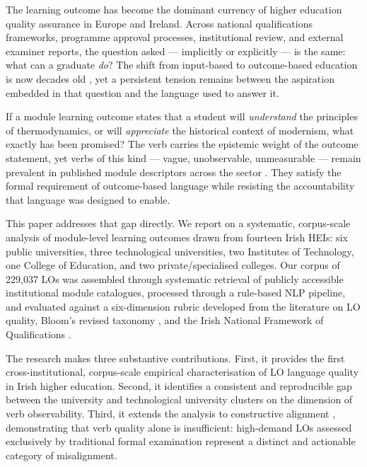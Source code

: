 \documentclass[12pt, a4paper]{article}
\begin{document}
The learning outcome has become the dominant currency of higher education quality
assurance in Europe and Ireland. Across national qualifications frameworks, programme
approval processes, institutional review, and external examiner reports, the question
asked --- implicitly or explicitly --- is the same: what can a graduate \emph{do}?
The shift from input-based to outcome-based education is now decades old
\citep{adam2004using, kennedy2007writing}, yet a persistent tension remains between
the aspiration embedded in that question and the language used to answer it.

If a module learning outcome states that a student will \textit{understand} the
principles of thermodynamics, or will \textit{appreciate} the historical context of
modernism, what exactly has been promised? The verb carries the epistemic weight of
the outcome statement, yet verbs of this kind --- vague, unobservable, unmeasurable
--- remain prevalent in published module descriptors across the sector
\citep{hussey2002trouble, moon2002module}. They satisfy the formal requirement of
outcome-based language while resisting the accountability that language was designed
to enable.

This paper addresses that gap directly. We report on a systematic, corpus-scale
analysis of module-level learning outcomes drawn from fourteen Irish HEIs: six public
universities, three technological universities, two Institutes of Technology, one College
of Education, and two private/specialised colleges.
Our corpus of 229,037 LOs was assembled through
systematic retrieval of publicly accessible institutional module catalogues, processed through a rule-based NLP
pipeline, and evaluated against a six-dimension rubric developed from the literature
on LO quality, Bloom's revised taxonomy \citep{anderson2001taxonomy}, and the Irish
National Framework of Qualifications \citep{qqi2020nfq}.

The research makes three substantive contributions. First, it provides the first
cross-institutional, corpus-scale empirical characterisation of LO language quality
in Irish higher education. Second, it identifies a consistent and reproducible gap
between the university and technological university clusters on the dimension of
verb observability. Third, it extends the analysis to constructive alignment
\citep{biggs2011teaching}, demonstrating that verb quality alone is insufficient:
high-demand LOs assessed exclusively by traditional formal examination represent
a distinct and actionable category of misalignment.
\end{document}
